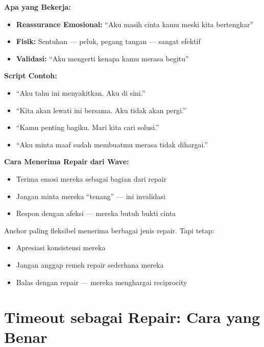 \begin{praktikbox}
\textbf{Apa yang Bekerja:}
\begin{itemize}
    \item \textbf{Reassurance Emosional:} ``Aku masih cinta kamu meski kita bertengkar''
    \item \textbf{Fisik:} Sentuhan --- peluk, pegang tangan --- sangat efektif
    \item \textbf{Validasi:} ``Aku mengerti kenapa kamu merasa begitu''
\end{itemize}

\textbf{Script Contoh:}
\begin{itemize}
    \item ``Aku tahu ini menyakitkan. Aku di sini.''
    \item ``Kita akan lewati ini bersama. Aku tidak akan pergi.''
    \item ``Kamu penting bagiku. Mari kita cari solusi.''
    \item ``Aku minta maaf sudah membuatmu merasa tidak dihargai.''
\end{itemize}

\textbf{Cara Menerima Repair dari Wave:}
\begin{itemize}
    \item Terima emosi mereka sebagai bagian dari repair
    \item Jangan minta mereka ``tenang'' --- ini invalidasi
    \item Respon dengan afeksi --- mereka butuh bukti cinta
\end{itemize}
\end{praktikbox}

\begin{tipbox}
Anchor paling fleksibel menerima berbagai jenis repair. Tapi tetap:
\begin{itemize}
    \item Apresiasi konsistensi mereka
    \item Jangan anggap remeh repair sederhana mereka
    \item Balas dengan repair --- mereka menghargai reciprocity
\end{itemize}
\end{tipbox}

\section{Timeout sebagai Repair: Cara yang Benar}

